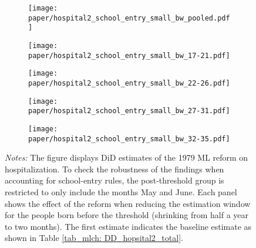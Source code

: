 \begin{figure}[H]\centering\caption{Robustness: Account for School Cutoff Rules for Hospitalization}\label{fig_mlch: school_cutoff_hospital}
	\begin{subfigure}[h]{0.48\linewidth}\centering
		\texttt{[image: paper/hospital2\_school\_entry\_small\_bw\_pooled.pdf]}
	\end{subfigure}
	
	\begin{subfigure}[h]{0.48\linewidth}\centering
		\texttt{[image: paper/hospital2\_school\_entry\_small\_bw\_17-21.pdf]}
	\end{subfigure}
	\begin{subfigure}[h]{0.48\linewidth}\centering
		\texttt{[image: paper/hospital2\_school\_entry\_small\_bw\_22-26.pdf]}
	\end{subfigure}
	\begin{subfigure}[h]{0.48\linewidth}\centering
		\texttt{[image: paper/hospital2\_school\_entry\_small\_bw\_27-31.pdf]}
	\end{subfigure}
	\begin{subfigure}[h]{0.48\linewidth}\centering
		\texttt{[image: paper/hospital2\_school\_entry\_small\_bw\_32-35.pdf]}
	\end{subfigure}
	\scriptsize
	\begin{minipage}{\linewidth}
		\emph{Notes:} The figure displays DiD estimates of the 1979 ML reform on hospitalization. To check the robustness of the findings when accounting for school-entry rules, the post-threshold group is restricted to only include the months May and June. Each panel shows the effect of the reform when reducing the estimation window for the people born before the threshold (shrinking from half a year to two months). The first estimate indicates the baseline estimate as shown in Table \ref{tab_mlch: DD_hopsital2_total}.
	\end{minipage}
\end{figure}









